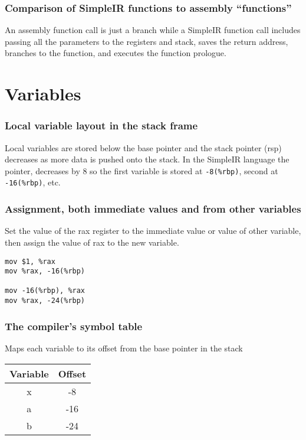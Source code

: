\documentclass{article}
\newcommand{\inlinecode}[1]{\colorbox{gray!20}{\texttt{#1}}}
\begin{document}
\subsubsection*{Comparison of SimpleIR functions to assembly ``functions''}

An assembly function call is just a branch while a SimpleIR function call includes passing all the parameters to the registers and stack, saves the return address, branches to the function, and executes the function prologue.

\section*{Variables}

\subsubsection*{Local variable layout in the stack frame}

Local variables are stored below the base pointer and the stack pointer (rsp) decreases as more data is pushed onto the stack. In the SimpleIR language the pointer, decreases by 8 so the first variable is stored at \inlinecode{-8(\%rbp)}, second at \inlinecode{-16(\%rbp)}, etc.

\subsubsection*{Assignment, both immediate values and from other variables}

Set the value of the rax register to the immediate value or value of other variable, then assign the value of rax to the new variable.

\begin{verbatim}
mov	$1, %rax
mov	%rax, -16(%rbp)

mov	-16(%rbp), %rax
mov	%rax, -24(%rbp)
\end{verbatim}

\subsubsection*{The compiler's symbol table}

Maps each variable to its offset from the base pointer in the stack

\begin{table}[h!]
    \centering
    \begin{tabular}{|c|c|}
    \hline
    \textbf{Variable} & \textbf{Offset} \\ \hline
    x & -8 \\ \hline
    a & -16 \\ \hline
    b & -24 \\ \hline
    \end{tabular}
    \end{table}
\end{document}
